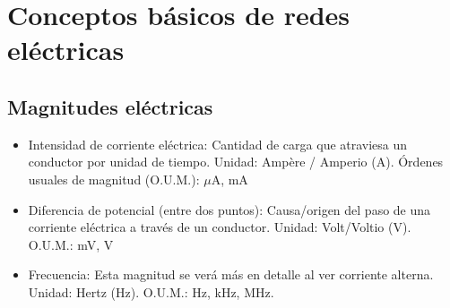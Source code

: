 \documentclass{article}
\begin{document}
\setcounter{section}{-1}
\section{Conceptos básicos de redes eléctricas}

\subsection{Magnitudes eléctricas}

\begin{itemize}
	\item Intensidad de corriente eléctrica: Cantidad de carga que atraviesa un conductor por unidad de tiempo. Unidad: Ampère / Amperio (A). Órdenes usuales de magnitud (O.U.M.): $\mu$A, mA
	\item Diferencia de potencial (entre dos puntos): Causa/origen del paso de una corriente eléctrica a través
	de un conductor. Unidad: Volt/Voltio (V). O.U.M.: mV, V
	\item Frecuencia: Esta magnitud se verá más en detalle al ver corriente alterna. Unidad: Hertz (Hz).
	 O.U.M.: Hz, kHz, MHz.
\end{itemize}
\end{document}
